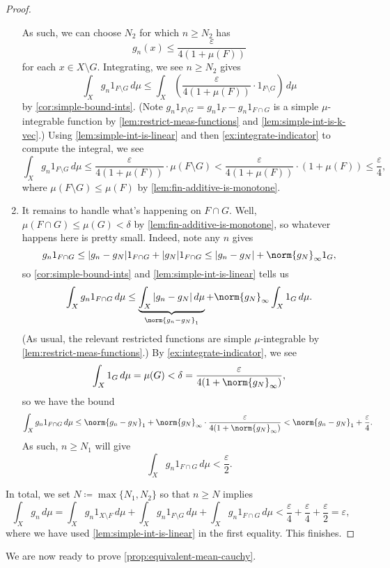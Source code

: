 \documentclass[../notes.tex]{subfiles}
\begin{document}
\begin{proof}
\begin{enumerate}
		As such, we can choose $N_2$ for which $n\ge N_2$ has
		\[g_n(x)\le\frac\varepsilon{4(1+\mu(F))}\]
		for each $x\in X\setminus G$. Integrating, we see $n\ge N_2$ gives
		\[\int_Xg_n1_{F\setminus G}\,d\mu\le\int_X\left(\frac\varepsilon{4(1+\mu(F))}\cdot1_{F\setminus G}\right)\,d\mu\]
		by \autoref{cor:simple-bound-ints}. (Note $g_n1_{F\setminus G}=g_n1_F-g_n1_{F\cap G}$ is a simple $\mu$-integrable function by \autoref{lem:restrict-meas-functions} and \autoref{lem:simple-int-is-k-vec}.) Using \autoref{lem:simple-int-is-linear} and then \autoref{ex:integrate-indicator} to compute the integral, we see
		\[\int_Xg_n1_{F\setminus G}\,d\mu\le\frac\varepsilon{4(1+\mu(F))}\cdot\mu(F\setminus G)<\frac\varepsilon{4(1+\mu(F))}\cdot(1+\mu(F))\le\frac\varepsilon4,\]
		where $\mu(F\setminus G)\le\mu(F)$ by \autoref{lem:fin-additive-is-monotone}.
		
		\item It remains to handle what's happening on $F\cap G$. Well, $\mu(F\cap G)\le\mu(G)<\delta$ by \autoref{lem:fin-additive-is-monotone}, so whatever happens here is pretty small. Indeed, note any $n$ gives
		\[g_n1_{F\cap G}\le|g_n-g_N|1_{F\cap G}+|g_N|1_{F\cap G}\le|g_n-g_N|+\norm{g_N}_\infty1_G,\]
		so \autoref{cor:simple-bound-ints} and \autoref{lem:simple-int-is-linear} tells us
		\[\int_Xg_n1_{F\cap G}\,d\mu\le\underbrace{\int_X|g_n-g_N|\,d\mu}_{\norm{g_n-g_N}_1}+\norm{g_N}_\infty\int_X1_G\,d\mu.\]
		(As usual, the relevant restricted functions are simple $\mu$-integrable by \autoref{lem:restrict-meas-functions}.) By \autoref{ex:integrate-indicator}, we see
		\[\int_X1_G\,d\mu=\mu(G)<\delta=\frac\varepsilon{4(1+\norm{g_N}_\infty)},\]
		so we have the bound
		\[\int_Xg_n1_{F\cap G}\,d\mu\le\norm{g_n-g_N}_1+\norm{g_N}_\infty\cdot\frac\varepsilon{4(1+\norm{g_N}_\infty)}<\norm{g_n-g_N}_1+\frac\varepsilon4.\]
		As such, $n\ge N_1$ will give
		\[\int_Xg_n1_{F\cap G}\,d\mu<\frac\varepsilon2.\]
	\end{enumerate}
	In total, we set $N\coloneqq\max\{N_1,N_2\}$ so that $n\ge N$ implies
	\[\int_Xg_n\,d\mu=\int_Xg_n1_{X\setminus F}\,d\mu+\int_Xg_n1_{F\setminus G}\,d\mu+\int_Xg_n1_{F\cap G}\,d\mu<\frac\varepsilon4+\frac\varepsilon4+\frac\varepsilon2=\varepsilon,\]
	where we have used \autoref{lem:simple-int-is-linear} in the first equality. This finishes.
\end{proof}
We are now ready to prove \autoref{prop:equivalent-mean-cauchy}.
\end{document}
